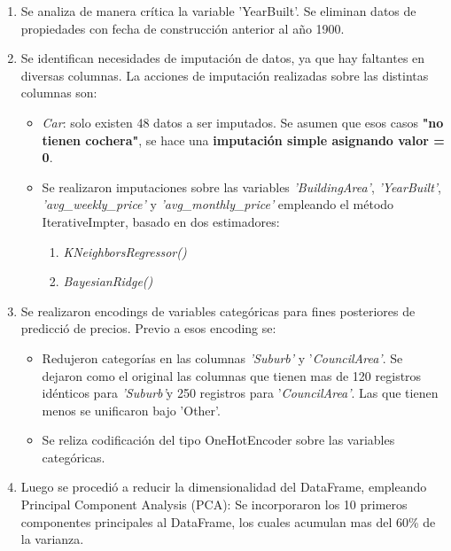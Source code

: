 \documentclass[11pt,a4paper,dvipsnames]{article}
\begin{document}
\begin{enumerate}
		\item Se analiza de manera crítica la variable 'YearBuilt'. Se eliminan datos de propiedades con fecha de construcción anterior al año 1900.
		
		\item Se identifican necesidades de imputación de datos, ya que hay faltantes en diversas columnas. La acciones de imputación realizadas sobre las distintas columnas son:
		
		\begin{itemize}
			\item \textit{Car}: solo existen 48 datos a ser imputados. Se asumen que esos casos \textbf{"no tienen cochera"}, se hace una \textbf{imputación simple asignando valor = 0}.
			\item Se realizaron imputaciones sobre las variables \textit{'BuildingArea'}, \textit{'YearBuilt'}, \textit{'avg\_weekly\_price'} y \textit{'avg\_monthly\_price'} empleando el método IterativeImpter, basado en dos estimadores:
			
			\begin{enumerate}
				\item \textit{KNeighborsRegressor()}
				\item \textit{BayesianRidge()}
			\end{enumerate}
			
		\end{itemize}
		
		\item Se realizaron encodings de variables categóricas para fines posteriores de predicció de precios. Previo a esos encoding se:
		
		\begin{itemize}
			\item Redujeron categorías en las columnas \textit{'Suburb'} y '\textit{CouncilArea'}. Se dejaron como el original las columnas que tienen mas de 120 registros idénticos para \textit{'Suburb'}y 250 registros para '\textit{CouncilArea'}. Las que tienen menos se unificaron bajo 'Other'. 
			\item Se reliza codificación del tipo OneHotEncoder sobre las variables categóricas.
		\end{itemize}
		
		
		\item Luego se procedió a reducir la dimensionalidad del DataFrame, empleando Principal Component Analysis (PCA): Se incorporaron los 10 primeros componentes principales al DataFrame, los cuales acumulan mas del 60\% de la varianza. 
	\end{enumerate}
	
\end{document}
